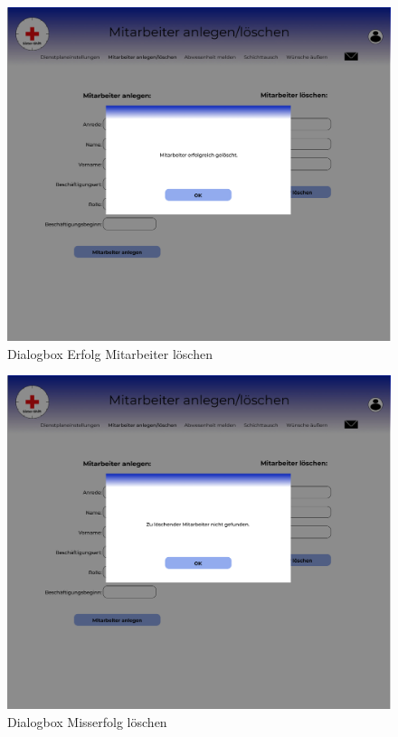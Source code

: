 \documentclass[11pt,
paper=a4,
bibtotocnumbered,	  %
liststotocnumbered,  %
DIV=calc,		  %
tablecaptionabove,	  %
headinclude,
]{article}
\begin{document}
\begin{figure}[H]
\includegraphics[width=1\textwidth]{Bilder/Screens/loeschen-Dialogbox(2).jpg}{\centering}
\caption{Dialogbox Erfolg Mitarbeiter löschen}
\end{figure}
\begin{figure}[H]
\includegraphics[width=1\textwidth]{Bilder/Screens/loeschen-Dialogbox(3).jpg}{\centering}
\caption{Dialogbox Misserfolg löschen}
\end{figure}
\end{document}
